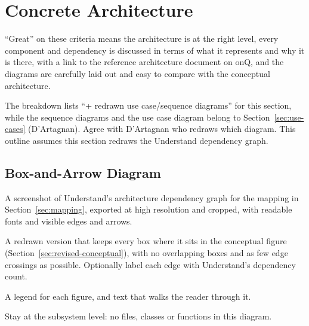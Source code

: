 \section{Concrete Architecture}
\label{sec:concrete}


\begin{requirements}
  \item ``Great'' on these criteria means the architecture is at the right level, every component and dependency is discussed in terms of what it represents and why it is there, with a link to the reference architecture document on onQ, and the diagrams are carefully laid out and easy to compare with the conceptual architecture.
  \item The breakdown lists ``+ redrawn use case/sequence diagrams'' for this section, while the sequence diagrams and the use case diagram belong to Section~\ref{sec:use-cases} (D'Artagnan). Agree with D'Artagnan who redraws which diagram. This outline assumes this section redraws the Understand dependency graph.
\end{requirements}

\subsection{Box-and-Arrow Diagram}
\label{sec:concrete-diagram}

\begin{requirements}
  \item A screenshot of Understand's architecture dependency graph for the mapping in Section~\ref{sec:mapping}, exported at high resolution and cropped, with readable fonts and visible edges and arrows.
  \item A redrawn version that keeps every box where it sits in the conceptual figure (Section~\ref{sec:revised-conceptual}), with no overlapping boxes and as few edge crossings as possible. Optionally label each edge with Understand's dependency count.
  \item A legend for each figure, and text that walks the reader through it.
  \item Stay at the subsystem level: no files, classes or functions in this diagram.
\end{requirements}

